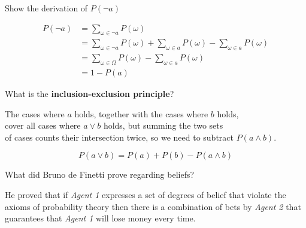 \begin{flashcard}[Question]{Show the derivation of $P(\neg a)$}

{\begin{align*}
P(\neg a)
&= \sum_{\omega \in \neg a} P(\omega) \\
&= \sum_{\omega \in \neg a} P(\omega) + \sum_{\omega \in a} P(\omega) - \sum_{\omega \in a} P(\omega) \\
&= \sum_{\omega \in \Omega} P(\omega) - \sum_{\omega \in a} P(\omega) \\
&= 1 - P(a)
\end{align*}}

\end{flashcard}

\begin{flashcard}[Question]{What is the \textbf{inclusion-exclusion principle}?}

\begin{center}
The cases where $a$ holds, together with the cases where $b$ holds,\\
cover all cases where $a \lor b$ holds, but summing the two sets\\
of cases counts their intersection twice, so we need to subtract $P(a \land b)$.
\end{center}

\begin{displaymath}
P(a \lor b) = P(a) + P(b) - P(a \land b)
\end{displaymath}

\end{flashcard}

\begin{flashcard}[Question]{What did Bruno de Finetti prove regarding beliefs?}

He proved that if \textit{Agent 1} expresses a set of degrees of belief that violate the axioms of probability theory then there is a combination of bets by \textit{Agent 2} that guarantees that \textit{Agent 1} will lose money every time.

\end{flashcard}

